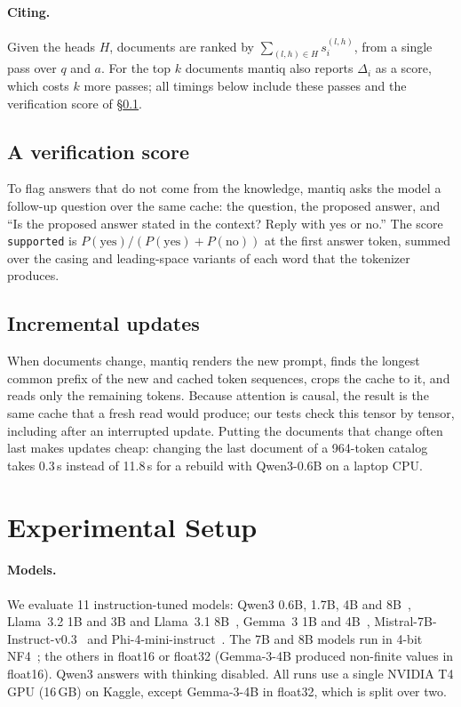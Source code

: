 \documentclass[11pt]{article}
\begin{document}
\paragraph{Citing.} Given the heads $H$, documents are ranked by $\sum_{(l,h)\in H} s^{(l,h)}_i$, from a single pass over $q$ and $a$. For the top $k$ documents mantiq also reports $\Delta_i$ as a score, which costs $k$ more passes; all timings below include these passes and the verification score of \S\ref{sec:supported-method}.

\subsection{A verification score}
\label{sec:supported-method}
To flag answers that do not come from the knowledge, mantiq asks the model a follow-up question over the same cache: the question, the proposed answer, and ``Is the proposed answer stated in the context? Reply with yes or no.'' The score \texttt{supported} is $P(\text{yes})/(P(\text{yes})+P(\text{no}))$ at the first answer token, summed over the casing and leading-space variants of each word that the tokenizer produces.

\subsection{Incremental updates}
\label{sec:updates}
When documents change, mantiq renders the new prompt, finds the longest common prefix of the new and cached token sequences, crops the cache to it, and reads only the remaining tokens. Because attention is causal, the result is the same cache that a fresh read would produce; our tests check this tensor by tensor, including after an interrupted update. Putting the documents that change often last makes updates cheap: changing the last document of a 964-token catalog takes 0.3\,s instead of 11.8\,s for a rebuild with Qwen3-0.6B on a laptop CPU.

\section{Experimental Setup}
\label{sec:setup}

\paragraph{Models.} We evaluate 11 instruction-tuned models: Qwen3 0.6B, 1.7B, 4B and 8B~\citep{qwen3}, Llama~3.2 1B and 3B and Llama~3.1 8B~\citep{llama3}, Gemma~3 1B and 4B~\citep{gemma3}, Mistral-7B-Instruct-v0.3~\citep{mistral7b} and Phi-4-mini-instruct~\citep{phi4mini}. The 7B and 8B models run in 4-bit NF4~\citep{dettmers2023qlora}; the others in float16 or float32 (Gemma-3-4B produced non-finite values in float16). Qwen3 answers with thinking disabled. All runs use a single NVIDIA T4 GPU (16\,GB) on Kaggle, except Gemma-3-4B in float32, which is split over two.
\end{document}
